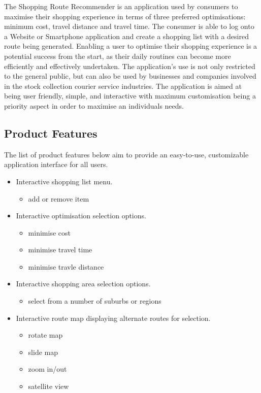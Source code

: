 \documentclass[10pt, a4paper, onecolumn]{scrartcl}
\begin{document}
			The Shopping Route Recommender is an application used by consumers to maximise their shopping experience in terms of three preferred optimisations: minimum cost, travel distance and travel time. The consumer is able to log onto a Website or Smartphone application and create a shopping list with a desired route being generated.  Enabling a user to optimise their shopping experience is a potential success from the start, as their daily routines can become more efficiently and effectively undertaken. The application's use is not only restricted to the general public, but can also be used by businesses and companies involved in the stock collection courier service industries. The application is aimed at being user friendly, simple, and interactive with maximum customisation being a priority aspect in order to maximise an individuals needs. 
		
		\subsection{Product Features}
		
			The list of product features below aim to provide an easy-to-use, customizable application interface for all users. 
		
			\begin{itemize}
				\item Interactive shopping list menu.
				\begin{itemize}
					\item add or remove item
				\end{itemize}
				\item Interactive optimisation selection options.
				\begin{itemize}
					\item minimise cost
					\item minimise travel time
					\item minimise travle distance
				\end{itemize}
				\item Interactive shopping area selection options.
				\begin{itemize}
					\item select from a number of suburbs or regions
				\end{itemize}
				\item Interactive route map displaying alternate routes for selection.
				\begin{itemize}
					\item rotate map
					\item slide map
					\item zoom in/out
					\item satellite view
				\end{itemize}
			\end{itemize}
		
\end{document}
